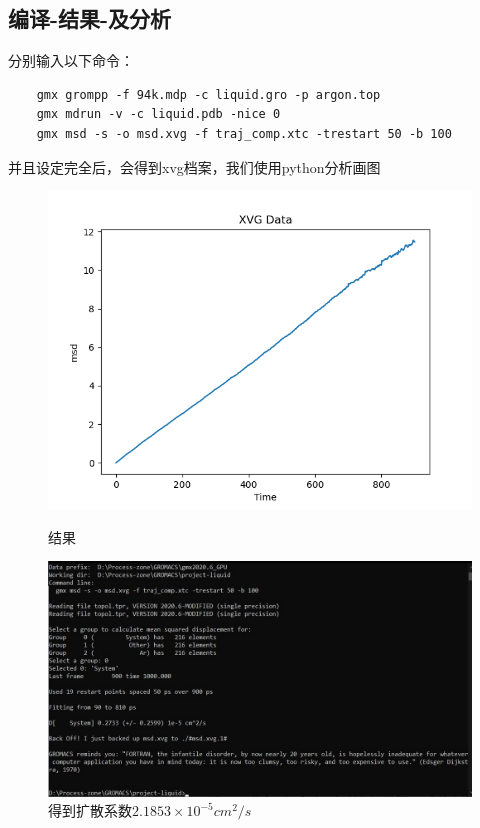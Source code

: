 \documentclass[12pt, a4paper, oneside]{ctexart}
\begin{document}
\begin{spacing}{2.0}
\section{编译-结果-及分析}
分别输入以下命令：
\begin{lstlisting}
    gmx grompp -f 94k.mdp -c liquid.gro -p argon.top
    gmx mdrun -v -c liquid.pdb -nice 0
    gmx msd -s -o msd.xvg -f traj_comp.xtc -trestart 50 -b 100
\end{lstlisting}
并且设定完全后，会得到xvg档案，我们使用python分析画图
\begin{figure}[H]
    \begin{minipage}[t]{0.5\linewidth}
        \centering
        \includegraphics[scale=0.3]{msdxvg.png}
        \caption{结果}
        \label{fig:side:a}
      \end{minipage}%
      \begin{minipage}[t]{0.5\linewidth}
        \centering
        \includegraphics[scale=0.3]{msdxvgworking.jpg}
        \caption{得到扩散系数$2.1853\times 10^{-5}cm^2/s$}
        \label{fig:side:b}
      \end{minipage}
\end{figure}


\end{spacing}
\end{document}

